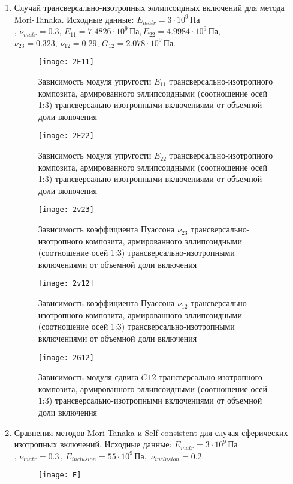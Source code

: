 \documentclass[12pt, a4paper]{article}
\begin{document}
\begin{enumerate}
	\clearpage
	
	
	\item Случай трансверсально-изотропных эллипсоидных включений для метода Mori-Tanaka. Исходные данные: $E_{matr} = 3\cdot10^9\,$Па$,\, \nu_{matr} = 0.3,\,E_{11}=7.4826\cdot10^9\,$Па,$\,E_{22}=4.9984\cdot10^9\,$Па, $\nu_{23}=0.323,\,\nu_{12}=0.29,\, G_{12}=2.078\cdot10^9\,$Па.
	\begin{figure}[h!]
		\centering
		\texttt{[image: 2E11]}
		
		\caption{Зависимость модуля упругости $E_{11}$ трансверсально-изотропного композита, армированного эллипсоидными (соотношение осей 1:3) трансверсально-изотропными включениями от объемной доли включения}
	\end{figure}
	
	\begin{figure}[h!]
		\centering
		\texttt{[image: 2E22]}
		
		\caption{Зависимость модуля упругости $E_{22}$ трансверсально-изотропного композита, армированного эллипсоидными (соотношение осей 1:3) трансверсально-изотропными включениями от объемной доли включения}
	\end{figure}
	
	\newpage
	\begin{figure}[h!]
		\centering
		\texttt{[image: 2v23]}
		\caption{Зависимость коэффициента Пуассона $\nu_{23}$ трансверсально-изотропного композита, армированного эллипсоидными (соотношение осей 1:3) трансверсально-изотропными включениями от объемной доли включения}
	\end{figure}
	\begin{figure}[h!]
		\centering
		\texttt{[image: 2v12]}
		\caption{Зависимость коэффициента Пуассона $\nu_{12}$ трансверсально-изотропного композита, армированного эллипсоидными (соотношение осей 1:3) трансверсально-изотропными включениями от объемной доли включения}
	\end{figure}
	\begin{figure}[h!]
		\centering
		\texttt{[image: 2G12]}
		
		\caption{ Зависимость модуля сдвига $G{12}$ трансверсально-изотропного композита, армированного эллипсоидными (соотношение осей 1:3) трансверсально-изотропными включениями от объемной доли включения}
	\end{figure}

\clearpage
	
	\item Сравнения методов Mori-Tanaka и Self-consistent для случая сферических изотропных включений. Исходные данные: $ E_{matr} = 3\cdot10^9\,$Па$,\, \nu_{matr} = 0.3\,,\, E_{inclusion} = 55\cdot10^9\,$Па, $\, \nu_{inclusion} = 0.2$.
	\begin{figure}[h!]
		\centering
		\texttt{[image: E]}
		

\end{figure}
\end{enumerate}
\end{document}
